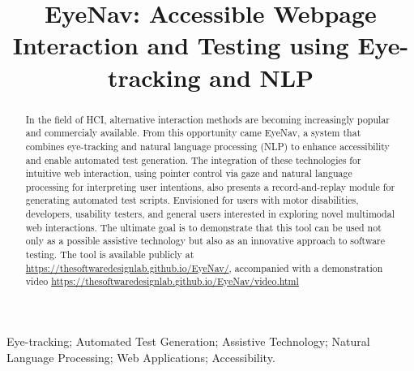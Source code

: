 \documentclass[10pt, conference]{IEEEtran}
\begin{document}
\title{EyeNav: Accessible Webpage Interaction and Testing using Eye-tracking and NLP}

\author{
}

\maketitle

\begin{abstract}
In the field of \ac{HCI}, alternative interaction methods are becoming increasingly popular and commercialy available. From this opportunity came EyeNav, a system that combines eye-tracking and natural language processing (NLP) to enhance accessibility and enable automated test generation. The integration of these technologies for intuitive web interaction, using pointer control via gaze and natural language processing for interpreting user intentions, also presents a record-and-replay module for generating automated test scripts. Envisioned for users with motor disabilities, developers, usability testers, and general users interested in exploring novel multimodal web interactions.
The ultimate goal is to demonstrate that this tool can be used not only as a possible assistive technology but also as an innovative approach to software testing. The tool is available publicly at \href{https://thesoftwaredesignlab.github.io/EyeNav/}{https://thesoftwaredesignlab.github.io/EyeNav/}, accompanied with a demonstration video \href{https://thesoftwaredesignlab.github.io/EyeNav/video.html}{https://thesoftwaredesignlab.github.io/EyeNav/video.html} 
\end{abstract}


\begin{IEEEkeywords}
Eye-tracking; Automated Test Generation; Assistive Technology; Natural Language Processing; Web Applications; Accessibility.
\end{IEEEkeywords}







\balance


\end{document}
